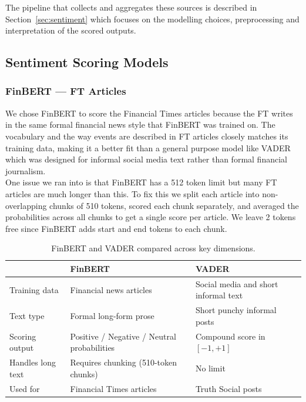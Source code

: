 \documentclass[11pt,a4paper]{article}
\begin{document}
The pipeline that collects and aggregates these sources is described
in Section~\ref{sec:sentiment} which focuses on the modelling
choices, preprocessing and interpretation of the scored outputs.\\

\subsection{Sentiment Scoring Models}

\subsubsection*{FinBERT --- FT Articles}

We chose FinBERT to score the Financial Times articles because the FT 
writes in the same formal financial news style that FinBERT was trained 
on. The vocabulary and the way events are described in FT articles closely 
matches its training data, making it a better fit than a general purpose model like VADER which was designed for informal social media text rather than formal financial journalism.\\

One issue we ran into is that FinBERT has a 512 token limit but 
many FT articles are much longer than this. To fix this we split each 
article into non-overlapping chunks of 510 tokens, scored each chunk 
separately, and averaged the probabilities across all chunks to get a 
single score per article. We leave 2 tokens free since FinBERT adds start and end tokens to each chunk.

\begin{table}[H]
\centering
\caption{FinBERT and VADER compared across key dimensions.}
\label{tab:model_comparison}
\small
\begin{tabularx}{\textwidth}{l X X}
\toprule
& \textbf{FinBERT} & \textbf{VADER} \\
\midrule
Training data      & Financial news articles & Social media and short informal text \\
Text type          & Formal long-form prose & Short punchy informal posts \\
Scoring output     & Positive / Negative / Neutral probabilities & Compound score in $[-1, +1]$ \\
Handles long text  & Requires chunking (510-token chunks) & No limit \\
Used for           & Financial Times articles & Truth Social posts \\
\bottomrule
\end{tabularx}
\end{table}
\end{document}
